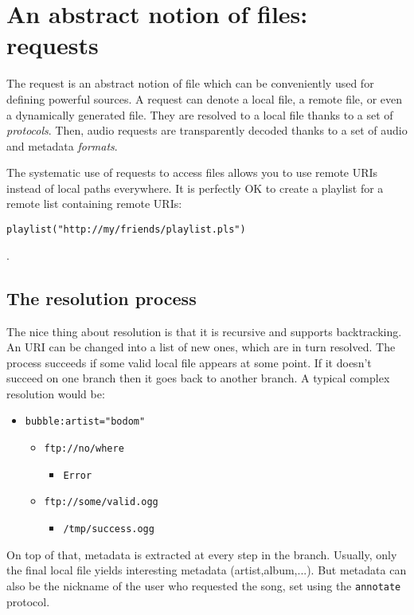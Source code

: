 \section{An abstract notion of files: requests}
The request is an abstract notion of file which can be conveniently used for defining powerful sources. A request can denote a local file, a remote file, or even a dynamically generated file. They are resolved to a local file thanks to a set of \emph{protocols}. Then, audio requests are transparently decoded thanks to a set of audio and metadata \emph{formats}.

The systematic use of requests to access files allows you to use remote URIs instead of local paths everywhere. It is perfectly OK to create a playlist for a remote list containing remote URIs: \begin{verbatim}
playlist("http://my/friends/playlist.pls")
\end{verbatim}
.

\subsection{The resolution process}
The nice thing about resolution is that it is recursive and supports backtracking. An URI can be changed into a list of new ones, which are in turn resolved. The process succeeds if some valid local file appears at some point. If it doesn't succeed on one branch then it goes back to another branch. A typical complex resolution would be:

\begin{itemize}
\item \verb+bubble:artist="bodom"+\begin{itemize}
\item \verb+ftp://no/where+\begin{itemize}
\item \verb+Error+

\end{itemize}

\item \verb+ftp://some/valid.ogg+\begin{itemize}
\item \verb+/tmp/success.ogg+

\end{itemize}


\end{itemize}


\end{itemize}
On top of that, metadata is extracted at every step in the branch. Usually, only the final local file yields interesting metadata (artist,album,...). But metadata can also be the nickname of the user who requested the song, set using the \verb+annotate+ protocol.

